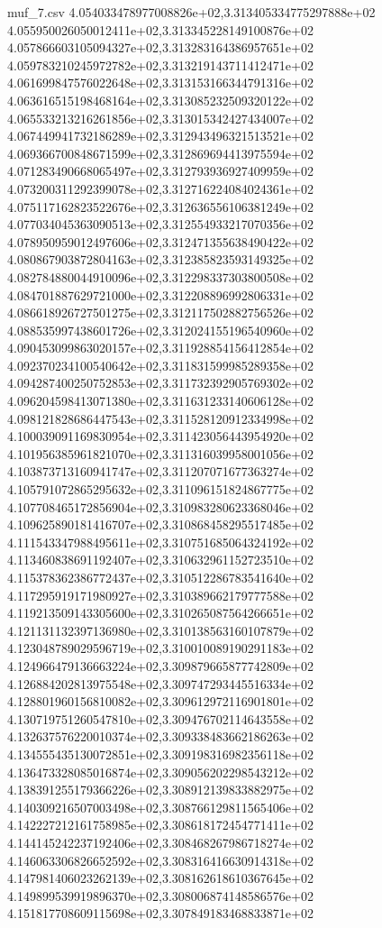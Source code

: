 \begin{filecontents*}{muf_7.csv}
4.054033478977008826e+02,3.313405334775297888e+02
4.055950026050012411e+02,3.313345228149100876e+02
4.057866603105094327e+02,3.313283164386957651e+02
4.059783210245972782e+02,3.313219143711412471e+02
4.061699847576022648e+02,3.313153166344791316e+02
4.063616515198468164e+02,3.313085232509320122e+02
4.065533213216261856e+02,3.313015342427434007e+02
4.067449941732186289e+02,3.312943496321513521e+02
4.069366700848671599e+02,3.312869694413975594e+02
4.071283490668065497e+02,3.312793936927409959e+02
4.073200311292399078e+02,3.312716224084024361e+02
4.075117162823522676e+02,3.312636556106381249e+02
4.077034045363090513e+02,3.312554933217070356e+02
4.078950959012497606e+02,3.312471355638490422e+02
4.080867903872804163e+02,3.312385823593149325e+02
4.082784880044910096e+02,3.312298337303800508e+02
4.084701887629721000e+02,3.312208896992806331e+02
4.086618926727501275e+02,3.312117502882756526e+02
4.088535997438601726e+02,3.312024155196540960e+02
4.090453099863020157e+02,3.311928854156412854e+02
4.092370234100540642e+02,3.311831599985289358e+02
4.094287400250752853e+02,3.311732392905769302e+02
4.096204598413071380e+02,3.311631233140606128e+02
4.098121828686447543e+02,3.311528120912334998e+02
4.100039091169830954e+02,3.311423056443954920e+02
4.101956385961821070e+02,3.311316039958001056e+02
4.103873713160941747e+02,3.311207071677363274e+02
4.105791072865295632e+02,3.311096151824867775e+02
4.107708465172856904e+02,3.310983280623368046e+02
4.109625890181416707e+02,3.310868458295517485e+02
4.111543347988495611e+02,3.310751685064324192e+02
4.113460838691192407e+02,3.310632961152723510e+02
4.115378362386772437e+02,3.310512286783541640e+02
4.117295919171980927e+02,3.310389662179777588e+02
4.119213509143305600e+02,3.310265087564266651e+02
4.121131132397136980e+02,3.310138563160107879e+02
4.123048789029596719e+02,3.310010089190291183e+02
4.124966479136663224e+02,3.309879665877742809e+02
4.126884202813975548e+02,3.309747293445516334e+02
4.128801960156810082e+02,3.309612972116901801e+02
4.130719751260547810e+02,3.309476702114643558e+02
4.132637576220010374e+02,3.309338483662186263e+02
4.134555435130072851e+02,3.309198316982356118e+02
4.136473328085016874e+02,3.309056202298543212e+02
4.138391255179366226e+02,3.308912139833882975e+02
4.140309216507003498e+02,3.308766129811565406e+02
4.142227212161758985e+02,3.308618172454771411e+02
4.144145242237192406e+02,3.308468267986718274e+02
4.146063306826652592e+02,3.308316416630914318e+02
4.147981406023262139e+02,3.308162618610367645e+02
4.149899539919896370e+02,3.308006874148586576e+02
4.151817708609115698e+02,3.307849183468833871e+02

\end{filecontents*}
